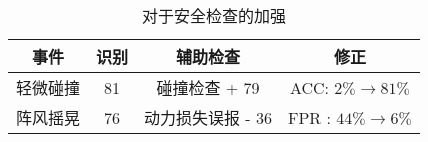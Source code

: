 \begin{table}[ht]
\caption{\deccheck 对于安全检查的加强}
\label{tab:check_cmp_check}
\centering
\begin{tabular}{c|c|c|c}
        \toprule[1.5pt]
         {事件}  & {识别} & {辅助检查} & {修正} \\
         \midrule[0.8pt]
         轻微碰撞 & 81 & 碰撞检查 + 79  &  ACC: $2\% \to 81\%$\\
        阵风摇晃 & 76 & 动力损失误报 - 36 &  FPR : $44\% \to 6\% $ \\
        \bottomrule[1.5pt]
\end{tabular}
\end{table}
